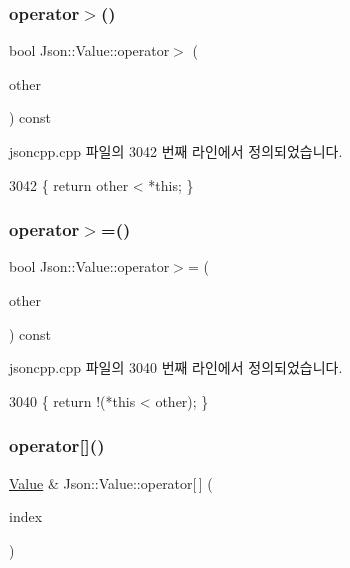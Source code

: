 \subsubsection{\texorpdfstring{operator$>$()}{operator>()}}
{\footnotesize\ttfamily bool Json\+::\+Value\+::operator$>$ (\begin{DoxyParamCaption}\item[{const \hyperlink{class_json_1_1_value}{Value} \&}]{other }\end{DoxyParamCaption}) const}



jsoncpp.\+cpp 파일의 3042 번째 라인에서 정의되었습니다.


\begin{DoxyCode}
3042 \{ \textcolor{keywordflow}{return} other < *\textcolor{keyword}{this}; \}
\end{DoxyCode}
\mbox{\label{class_json_1_1_value_afe2c3e52df60b9622cbd8358b74bdbf5}} 
\subsubsection{\texorpdfstring{operator$>$=()}{operator>=()}}
{\footnotesize\ttfamily bool Json\+::\+Value\+::operator$>$= (\begin{DoxyParamCaption}\item[{const \hyperlink{class_json_1_1_value}{Value} \&}]{other }\end{DoxyParamCaption}) const}



jsoncpp.\+cpp 파일의 3040 번째 라인에서 정의되었습니다.


\begin{DoxyCode}
3040 \{ \textcolor{keywordflow}{return} !(*\textcolor{keyword}{this} < other); \}
\end{DoxyCode}
\mbox{\label{class_json_1_1_value_a7d99f5dba388cdaa152ce6ef933d64ef}} 
\subsubsection{\texorpdfstring{operator[]()}{operator[]()}\hspace{0.1cm}{\footnotesize\ttfamily [1/9]}}
{\footnotesize\ttfamily \hyperlink{class_json_1_1_value}{Value} \& Json\+::\+Value\+::operator\mbox{[}$\,$\mbox{]} (\begin{DoxyParamCaption}\item[{\hyperlink{class_json_1_1_value_a184a91566cccca7b819240f0d5561c7d}{Array\+Index}}]{index }\end{DoxyParamCaption})}

